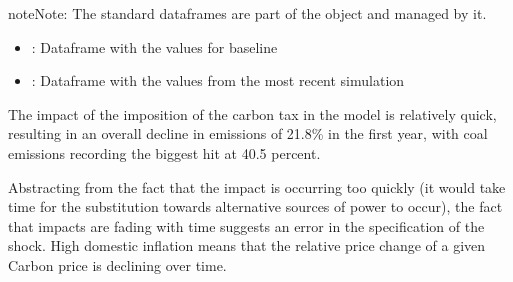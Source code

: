 \documentclass[letterpaper,10pt,english]{jupyterBook}
\begin{document}
\begin{sphinxadmonition}{note}{Note:}
\sphinxAtStartPar
The standard dataframes are part of the  object and managed by it.
\begin{itemize}
\item {} 
\sphinxAtStartPar
{}: Dataframe with the values for baseline

\item {} 
\sphinxAtStartPar
{}: Dataframe with the values from the most recent simulation

\end{itemize}
\end{sphinxadmonition}

\sphinxAtStartPar
The impact of the imposition of the carbon tax in the model is relatively quick, resulting in an overall decline in emissions of 21.8\% in the first year, with coal emissions recording the biggest hit at \sphinxhyphen{}40.5 percent.

\sphinxAtStartPar
Abstracting from the fact that the impact is occurring too quickly (it would take time for the substitution towards alternative sources of power to occur), the fact that impacts are fading with time suggests an error in the specification of the shock.  High domestic inflation means that the relative price change of a given Carbon price is declining over time.
\end{document}
